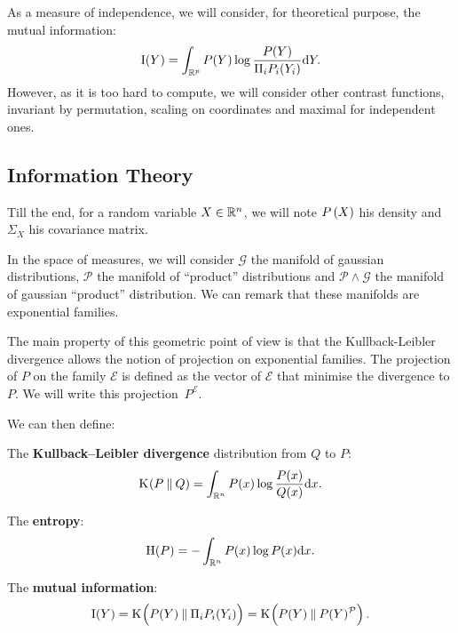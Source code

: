 \documentclass[a4paper]{article}
\newcommand{\Kl}[3][]{\mathrm K_{#1}\!\zp{#2\:\|\:#3}}
\newcommand{\zZ}[2]{\mathrm #1\!\zp{#2}}
\newcommand{\zD}{\mathcal}
\begin{document}
As a measure of independence, we will consider, for theoretical purpose,
the mutual information:\begin{equation}
  \zZ IY = \int_{\zR^p} P(Y) \log\frac{P(Y)}{\Pi_i P_i(Y_i)} \zdx Y.
\end{equation}
However, as it is too hard to compute, we will consider other contrast functions, invariant by permutation, scaling on coordinates and maximal for independent ones.


\subsection{Information Theory}

Till the end, for a random variable $X\in\mathbb{R}^n$, we will note $P\zp{X}$ his density and $\Sigma_X$ his covariance matrix.
\znl

In the space of measures, we will consider $\zD G$ the manifold of gaussian distributions, $\zD P$ the manifold of ``product'' distributions and $\zD P\wedge\zD G$ the manifold of gaussian ``product'' distribution. We can remark that these manifolds are exponential families.

The main property of this geometric point of view is that the Kullback-Leibler divergence allows the notion of projection on exponential families. The projection of $P$ on the family $\zD E$ is defined as the vector of $\zD E$ that minimise the divergence to $P$. We will write this projection~$P^{\zD E}$.

\znl

We can then define:

The \textbf{Kullback--Leibler divergence} distribution from $Q$ to $P$:
\begin{equation}
  \Kl PQ = \int_{\zR^n} P(x) \log\frac{P(x)}{Q(x)} \zdx x.
\end{equation}

The \textbf{entropy}:\begin{equation}
  \zZ HP = - \int_{\zR^n} P(x)\log P(x) \zdx x.
\end{equation}

The \textbf{mutual information}:
\begin{equation}
  \zZ IY = \Kl {\zpbig2 P(Y)}{\Pi_i P_i(Y_i)} = \Kl {\zpbig2 P(Y)}{P(Y)^{\zD P}}.
\end{equation}
\end{document}
